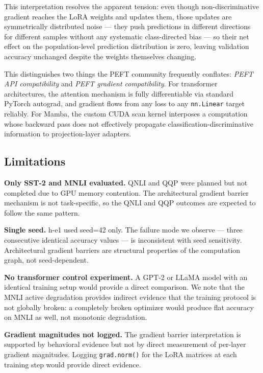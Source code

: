 This interpretation resolves the apparent tension: even though non-discriminative gradient reaches the LoRA weights and updates them, those updates are symmetrically distributed noise --- they push predictions in different directions for different samples without any systematic class-directed bias --- so their net effect on the population-level prediction distribution is zero, leaving validation accuracy unchanged despite the weights themselves changing.

This distinguishes two things the PEFT community frequently conflates: \emph{PEFT API compatibility} and \emph{PEFT gradient compatibility}. For transformer architectures, the attention mechanism is fully differentiable via standard PyTorch autograd, and gradient flows from any loss to any \texttt{nn.Linear} target reliably. For Mamba, the custom CUDA scan kernel interposes a computation whose backward pass does not effectively propagate classification-discriminative information to projection-layer adapters.

\subsection{Limitations}

\textbf{Only SST-2 and MNLI evaluated.} QNLI and QQP were planned but not completed due to GPU memory contention. The architectural gradient barrier mechanism is not task-specific, so the QNLI and QQP outcomes are expected to follow the same pattern.

\textbf{Single seed.} h-e1 used seed=42 only. The failure mode we observe --- three consecutive identical accuracy values --- is inconsistent with seed sensitivity. Architectural gradient barriers are structural properties of the computation graph, not seed-dependent.

\textbf{No transformer control experiment.} A GPT-2 or LLaMA model with an identical training setup would provide a direct comparison. We note that the MNLI active degradation provides indirect evidence that the training protocol is not globally broken: a completely broken optimizer would produce flat accuracy on MNLI as well, not monotonic degradation.

\textbf{Gradient magnitudes not logged.} The gradient barrier interpretation is supported by behavioral evidence but not by direct measurement of per-layer gradient magnitudes. Logging \texttt{grad.norm()} for the LoRA matrices at each training step would provide direct evidence.

